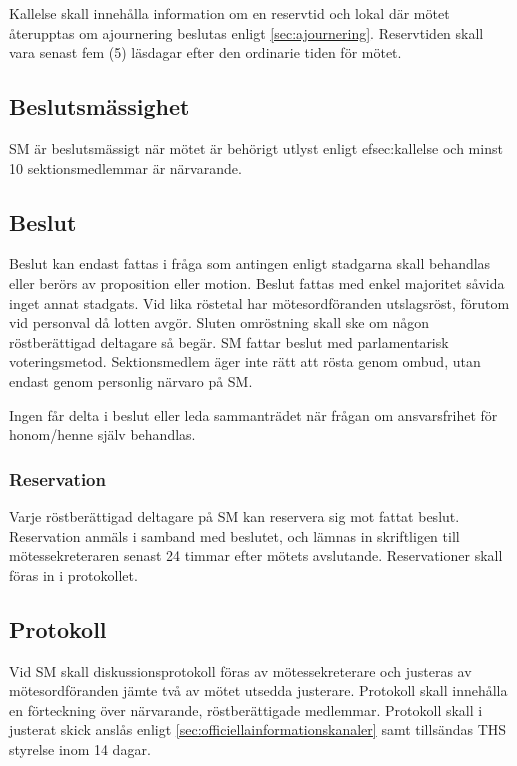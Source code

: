 \documentclass[a4paper,12pt]{article}
\begin{document}
Kallelse skall innehålla information om en reservtid och lokal där mötet återupptas om ajournering beslutas enligt \ref{sec:ajournering}. Reservtiden skall vara senast fem (5) läsdagar efter den ordinarie tiden för mötet.

\subsection{Beslutsmässighet}

SM är beslutsmässigt när mötet är behörigt utlyst enligt 
ef{sec:kallelse} och minst 10 sektionsmedlemmar är närvarande.

\subsection{Beslut}

Beslut kan endast fattas i fråga som antingen enligt stadgarna skall behandlas eller berörs av proposition eller motion. Beslut fattas med enkel majoritet såvida inget annat stadgats. Vid lika röstetal har mötesordföranden utslagsröst, förutom vid personval då lotten avgör. Sluten omröstning skall ske om någon röstberättigad deltagare så begär. SM fattar beslut med parlamentarisk voteringsmetod. Sektionsmedlem äger inte rätt att rösta genom ombud, utan endast genom personlig närvaro på SM.

Ingen får delta i beslut eller leda sammanträdet när frågan om ansvarsfrihet för honom/henne själv behandlas.

\subsubsection{Reservation}

Varje röstberättigad deltagare på SM kan reservera sig mot fattat beslut. Reservation anmäls i samband med beslutet, och lämnas in skriftligen till mötessekreteraren senast 24 timmar efter mötets avslutande. Reservationer skall föras in i protokollet.

\subsection{Protokoll}

Vid SM skall diskussionsprotokoll föras av mötessekreterare och justeras av mötesordföranden jämte två av mötet utsedda justerare. Protokoll skall innehålla en förteckning över närvarande, röstberättigade medlemmar. Protokoll skall i justerat skick anslås enligt \ref{sec:officiellainformationskanaler} samt tillsändas THS styrelse inom 14 dagar.
\end{document}
